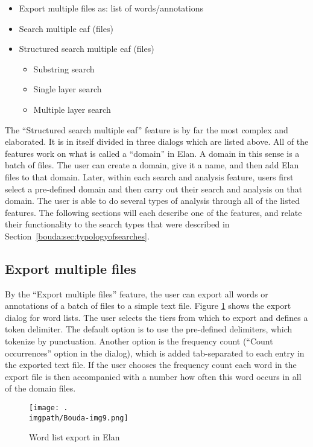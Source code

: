 \begin{itemize}
\item Export multiple files as: list of words/annotations
\item Search multiple eaf (files)
\item Structured search multiple eaf (files)
 \begin{itemize}
 \item Substring search
 \item Single layer search
 \item Multiple layer search
 \end{itemize}
\end{itemize}

The ``Structured search multiple eaf'' feature is by far the most complex and elaborated. It is in itself divided in three dialogs which are listed above. All of the features work on what is called a ``domain'' in Elan. A domain in this sense is a batch of files. The user can create a domain, give it a name, and then add Elan files to that domain. Later, within each search and analysis feature, users first select a pre-defined domain and then carry out their search and analysis on that domain. The user is able to do several types of analysis through all of the listed features. The following sections will each describe one of the features, and relate their functionality to the search types that were described in Section\ \ref{bouda:sec:typologyofsearches}.

\subsection{Export multiple files}

By the ``Export multiple files'' feature, the user can export all words or annotations of a batch of files to a simple text file. Figure \ref{bouda:fig:elanexport} shows the export dialog for word lists. The user selects the tiers from which to export and defines a token delimiter. The default option is to use the pre-defined delimiters, which tokenize by punctuation. Another option is the frequency count (``Count occurrences'' option in the dialog), which is added tab-separated to each entry in the exported text file. If the user chooses the frequency count each word in the export file is then accompanied with a number how often this word occurs in all of the domain files.

\begin{figure}
 \texttt{[image: .\\imgpath/Bouda-img9.png]}
\caption{Word list export in Elan}
\label{bouda:fig:elanexport}
\end{figure}



